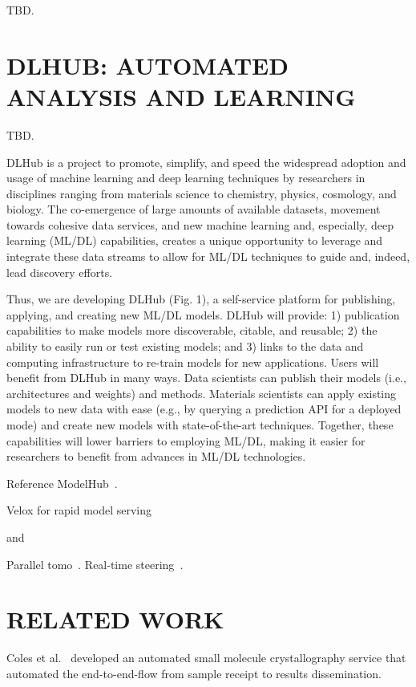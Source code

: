 \documentclass{aip-cp}
\begin{document}
TBD.


\section{DLHUB: AUTOMATED ANALYSIS AND LEARNING}

TBD.

DLHub is a project to promote, simplify, and speed the widespread adoption and usage of machine learning and deep learning techniques by researchers in disciplines ranging from materials science to chemistry, physics, cosmology, and biology. The co-emergence of large amounts of available datasets, movement towards cohesive data services, and new machine learning and, especially, deep learning (ML/DL) capabilities, creates a unique opportunity to leverage and integrate these data streams to allow for ML/DL techniques to guide and, indeed, lead discovery efforts.
 
Thus, we are developing DLHub (Fig. 1), a self-service platform for publishing, applying, and creating new ML/DL models. DLHub will provide: 1) publication capabilities to make models more discoverable, citable, and reusable; 2) the ability to easily run or test existing models; and 3) links to the data and computing infrastructure to re-train models for new applications. Users will benefit from DLHub in many ways. Data scientists can publish their models (i.e., architectures and weights) and methods. Materials scientists can apply existing models to new data with ease (e.g., by querying a prediction API for a deployed mode) and create new models with state-of-the-art techniques. Together, these capabilities will lower barriers to employing ML/DL, making it easier for researchers to benefit from advances in ML/DL technologies. 

Reference ModelHub~\cite{miao2017towards}. 


Velox for rapid model serving~\cite{crankshaw2014missing}

and~\cite{kumar2017data}


Parallel tomo~\cite{Bicer_Europar15}. Real-time steering~\cite{bicer2017real}.

\section{RELATED WORK}

Coles et al.~\cite{coles2005ecses,coles2006science} developed an automated small molecule crystallography service that automated the
end-to-end-flow from sample receipt to results dissemination.
\end{document}
